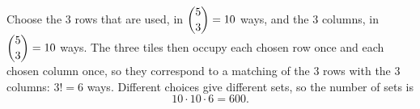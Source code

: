 Choose the $3$ rows that are used, in $\dbinom53=10$ ways, and the $3$ columns, in $\dbinom53=10$ ways. The three tiles then occupy each chosen row once and each chosen column once, so they correspond to a matching of the $3$ rows with the $3$ columns: $3!=6$ ways. Different choices give different sets, so the number of sets is
\[10\cdot10\cdot6=\boxed{600}.\]
